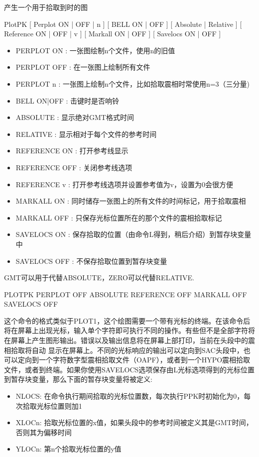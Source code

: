 \label{cmd:plotpk}

产生一个用于拾取到时的图

PlotPK [ Perplot ON | OFF | n ] [ BELL ON | OFF ] [ Absolute | Relative ] [ Reference ON | OFF | v ] [ Markall ON | OFF ] [ Savelocs ON | OFF ]

\begin{itemize}
\item PERPLOT ON : 一张图绘制n个文件，使用n的旧值 
\item PERPLOT OFF : 在一张图上绘制所有文件 
\item PERPLOT n : 一张图上绘制n个文件，比如拾取震相时常使用n=3（三分量) 
\item BELL {ON}|OFF :  击键时是否响铃 
\item ABSOLUTE : 显示绝对GMT格式时间 
\item RELATIVE : 显示相对于每个文件的参考时间 
\item REFERENCE {ON} : 打开参考线显示 
\item REFERENCE OFF : 关闭参考线选项 
\item REFERENCE v : 打开参考线选项并设置参考值为v，设置为0会很方便 
\item MARKALL {ON} : 同时储存一张图上的所有文件的时间标记，用于拾取震相 
\item MARKALL OFF : 只保存光标位置所在的那个文件的震相拾取标记 
\item SAVELOCS {ON} : 保存拾取的位置（由命令L得到，稍后介绍）到暂存块变量中 
\item SAVELOCS OFF :  不保存拾取位置到暂存块变量 
\end{itemize}

GMT可以用于代替ABSOLUTE，ZERO可以代替RELATIVE.

PLOTPK PERPLOT OFF ABSOLUTE REFERENCE OFF MARKALL OFF SAVELOCS OFF

这个命令的格式类似于PLOT1，这个绘图需要一个带有光标的终端。在该命令后将在屏幕上出现光标，输入单个字符即可执行不同的操作。有些但不是全部字符将在屏幕上产生图形输出。错误以及输出信息将在屏幕上部打印，当前在头段中的震相拾取将自动	显示在屏幕上。不同的光标响应的输出可以定向到SAC头段中，也可以定向到一个字符数字型震相拾取文件（OAPF），或者到一个HYPO震相拾取文件，或者到终端。如果你使用SAVELOCS选项保存由L光标选项得到的光标位置到暂存块变量，那么下面的暂存块变量将被定义:
\begin{itemize}
\item NLOCS: 在命令执行期间拾取的光标位置数，每次执行PPK时初始化为0，每次拾取光标位置则加1
\item XLOCn: 拾取光标位置的x值，如果头段中的参考时间被定义其是GMT时间，否则其为偏移时间
\item YLOCn: 第n个拾取光标位置的y值
\end{itemize}


